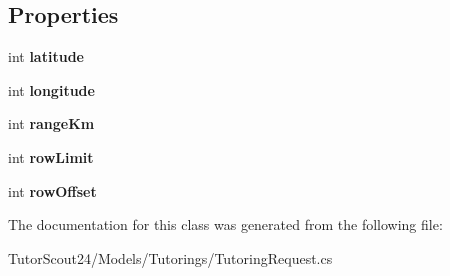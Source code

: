 \subsection*{Properties}
\begin{DoxyCompactItemize}
\item 
\mbox{\label{class_tutor_scout24_1_1_models_1_1_tutorings_1_1_tutoring_request_a7b54262ff08157347d7c0fa915713c4e}} 
int {\bfseries latitude}
\item 
\mbox{\label{class_tutor_scout24_1_1_models_1_1_tutorings_1_1_tutoring_request_aa4c4b472430063699a1e34f99d34d4dc}} 
int {\bfseries longitude}
\item 
\mbox{\label{class_tutor_scout24_1_1_models_1_1_tutorings_1_1_tutoring_request_a3bff624321db65da0b8b1f471b62f6d8}} 
int {\bfseries range\+Km}
\item 
\mbox{\label{class_tutor_scout24_1_1_models_1_1_tutorings_1_1_tutoring_request_a63b9273a34967d37b68f89bd61c14876}} 
int {\bfseries row\+Limit}
\item 
\mbox{\label{class_tutor_scout24_1_1_models_1_1_tutorings_1_1_tutoring_request_aef563f037a389080b70258fe07a84864}} 
int {\bfseries row\+Offset}
\end{DoxyCompactItemize}


The documentation for this class was generated from the following file\+:\begin{DoxyCompactItemize}
\item 
Tutor\+Scout24/\+Models/\+Tutorings/Tutoring\+Request.\+cs\end{DoxyCompactItemize}
